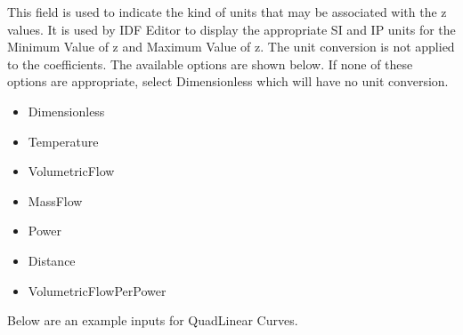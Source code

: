This field is used to indicate the kind of units that may be associated with the z values. It is used by IDF Editor to display the appropriate SI and IP units for the Minimum Value of z and Maximum Value of z. The unit conversion is not applied to the coefficients. The available options are shown below. If none of these options are appropriate, select Dimensionless which will have no unit conversion.

\begin{itemize}
\item
  Dimensionless
\item
  Temperature
\item
  VolumetricFlow
\item
  MassFlow
\item
  Power
\item
  Distance
\item
  VolumetricFlowPerPower
\end{itemize}

Below are an example inputs for QuadLinear Curves.


